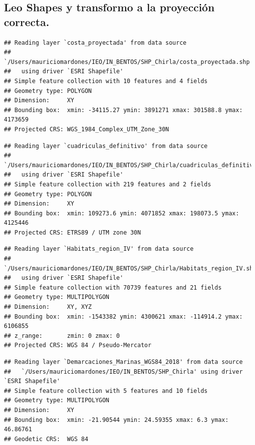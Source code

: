 \documentclass[
]{article}
\begin{document}
\hypertarget{leo-shapes-y-transformo-a-la-proyecciuxf3n-correcta.}{%
\subsection{Leo Shapes y transformo a la proyección correcta.}\label{leo-shapes-y-transformo-a-la-proyecciuxf3n-correcta.}}

\begin{verbatim}
## Reading layer `costa_proyectada' from data source 
##   `/Users/mauriciomardones/IEO/IN_BENTOS/SHP_Chirla/costa_proyectada.shp' 
##   using driver `ESRI Shapefile'
## Simple feature collection with 10 features and 4 fields
## Geometry type: POLYGON
## Dimension:     XY
## Bounding box:  xmin: -34115.27 ymin: 3891271 xmax: 301588.8 ymax: 4173659
## Projected CRS: WGS_1984_Complex_UTM_Zone_30N
\end{verbatim}

\begin{verbatim}
## Reading layer `cuadriculas_definitivo' from data source 
##   `/Users/mauriciomardones/IEO/IN_BENTOS/SHP_Chirla/cuadriculas_definitivo.shp' 
##   using driver `ESRI Shapefile'
## Simple feature collection with 219 features and 2 fields
## Geometry type: POLYGON
## Dimension:     XY
## Bounding box:  xmin: 109273.6 ymin: 4071852 xmax: 198073.5 ymax: 4125446
## Projected CRS: ETRS89 / UTM zone 30N
\end{verbatim}

\begin{verbatim}
## Reading layer `Habitats_region_IV' from data source 
##   `/Users/mauriciomardones/IEO/IN_BENTOS/SHP_Chirla/Habitats_region_IV.shp' 
##   using driver `ESRI Shapefile'
## Simple feature collection with 70739 features and 21 fields
## Geometry type: MULTIPOLYGON
## Dimension:     XY, XYZ
## Bounding box:  xmin: -1543382 ymin: 4300621 xmax: -114914.2 ymax: 6106855
## z_range:       zmin: 0 zmax: 0
## Projected CRS: WGS 84 / Pseudo-Mercator
\end{verbatim}

\begin{verbatim}
## Reading layer `Demarcaciones_Marinas_WGS84_2018' from data source 
##   `/Users/mauriciomardones/IEO/IN_BENTOS/SHP_Chirla' using driver `ESRI Shapefile'
## Simple feature collection with 5 features and 10 fields
## Geometry type: MULTIPOLYGON
## Dimension:     XY
## Bounding box:  xmin: -21.90544 ymin: 24.59355 xmax: 6.3 ymax: 46.86761
## Geodetic CRS:  WGS 84
\end{verbatim}
\end{document}
